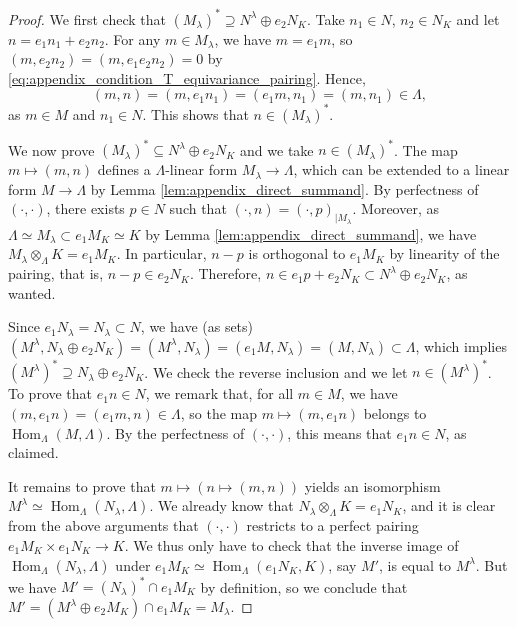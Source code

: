 \documentclass[12pt]{amsart}
\DeclareMathOperator{\Hom}{Hom}
\theoremstyle{defstyle}
\theoremstyle{thmstyle}
\begin{document}
\begin{proof}
	We first check that $(M_\lambda)^*\supseteq N^\lambda \oplus e_2 N_K$. Take $n_1\in N$, $n_2\in N_K$ and let $n=e_1n_1+e_2n_2$. For any $m\in M_\lambda$, we have $m=e_1m$, so $(m,e_2n_2)=(m,e_1e_2n_2)=0$ by \eqref{eq:appendix_condition_T_equivariance_pairing}. Hence,
	\[(m,n)= (m,e_1n_1) = (e_1m,n_1)=(m,n_1)\in\Lambda, \]
	as $m\in M$ and $n_1\in N$. This shows that $n\in (M_\lambda)^*$. 
	
	We now prove $(M_\lambda)^*\subseteq N^\lambda \oplus e_2 N_K$ and we take $n\in (M_\lambda)^*$. The map $m \mapsto (m,n)$ defines a $\Lambda$-linear form $M_\lambda \to \Lambda$, which can be extended to a linear form $M \to \Lambda$ by Lemma \ref{lem:appendix_direct_summand}. By perfectness of $(\cdot,\cdot)$, there exists $p\in N$ such that $(\cdot,n)=(\cdot,p)_{|M_\lambda}$. Moreover, as $\Lambda \simeq M_\lambda \subset e_1 M_K\simeq K$ by Lemma \ref{lem:appendix_direct_summand}, we have $M_\lambda \otimes_\Lambda K=e_1 M_K$. In particular, $n-p$ is orthogonal to $e_1M_K$ by linearity of the pairing, that is, $n-p\in e_2N_K$. Therefore, $n\in e_1p+e_2N_K \subset N^\lambda \oplus e_2N_K$, as wanted.
	
	Since $e_1N_\lambda=N_\lambda\subset N$, we have (as sets) $(M^\lambda,N_\lambda \oplus e_2 N_K)=(M^\lambda,N_\lambda)=(e_1M,N_\lambda)=(M,N_\lambda)\subset \Lambda$, which implies $(M^\lambda)^*\supseteq N_\lambda \oplus e_2 N_K$. We check the reverse inclusion and we let $n\in (M^\lambda)^*$. To prove that $e_1n\in N$, we remark that, for all $m\in M$, we have $(m,e_1n)=(e_1m,n)\in\Lambda$, so the map $m\mapsto (m,e_1n)$ belongs to $\Hom_\Lambda(M,\Lambda)$. By the perfectness of $(\cdot,\cdot)$, this means that $e_1n\in N$, as claimed.
	
	It remains to prove that $m\mapsto (n\mapsto (m,n))$ yields an isomorphism $M^\lambda\simeq \Hom_\Lambda(N_\lambda,\Lambda)$.
	We already know that $N_\lambda\otimes_\Lambda K=e_1N_K$, and it is clear from the above arguments that $(\cdot,\cdot)$ restricts to a perfect pairing $e_1M_K \times e_1N_K \to K$. We thus only have to check that the inverse image of $\Hom_\Lambda(N_\lambda,\Lambda)$ under $e_1M_K \simeq \Hom_\Lambda(e_1N_K,K)$, say $M'$, is equal to $M^\lambda$. But we have $M'=(N_\lambda)^*\cap e_1M_K$ by definition, so we conclude that $M'=(M^\lambda \oplus e_2M_K)\cap e_1M_K=M_\lambda$. 
\end{proof}
\end{document}
